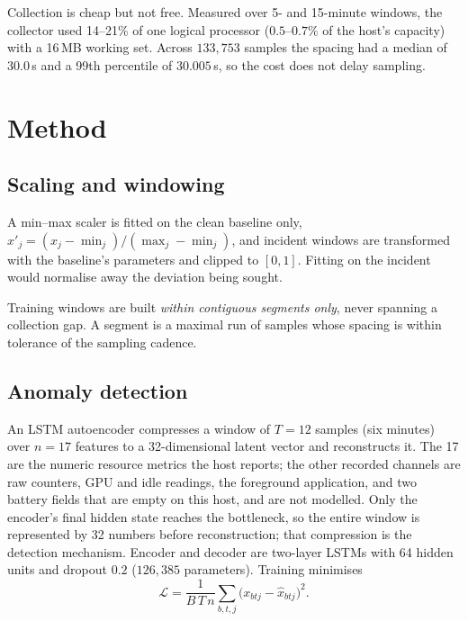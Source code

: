 \documentclass[conference,a4paper]{IEEEtran}
\begin{document}
Collection is cheap but not free. Measured over 5- and 15-minute windows,
the collector used 14--21\% of one logical processor ($0.5$--$0.7\%$ of the
host's capacity) with a 16\,MB working set. Across $133{,}753$ samples the
spacing had a median of $30.0$\,s and a 99th percentile of $30.005$\,s, so
the cost does not delay sampling.

\section{Method}
\label{sec:method}

\subsection{Scaling and windowing}

A min--max scaler is fitted on the clean baseline only,
$x'_j = (x_j - \min_j)/(\max_j - \min_j)$, and incident windows are transformed
with the baseline's parameters and clipped to $[0,1]$. Fitting on the incident
would normalise away the deviation being sought.

Training windows are built \emph{within contiguous segments only}, never
spanning a collection gap. A segment is a maximal run of samples whose spacing
is within tolerance of the sampling cadence.

\subsection{Anomaly detection}

An LSTM autoencoder compresses a window of $T=12$ samples (six minutes) over
$n=17$ features to a 32-dimensional latent vector and reconstructs it. The 17
are the numeric resource metrics the host reports; the other recorded
channels are raw counters, GPU and idle readings, the foreground application,
and two battery fields that are empty on this host, and are not modelled. Only the encoder's final
hidden state reaches the bottleneck, so the entire window is represented by 32
numbers before reconstruction; that compression is the detection mechanism.
Encoder and decoder are two-layer LSTMs with 64 hidden units and dropout
$0.2$ ($126{,}385$ parameters). Training minimises
\begin{equation}
\mathcal{L} = \frac{1}{B\,T\,n}\sum_{b,t,j}\bigl(x_{btj}-\hat{x}_{btj}\bigr)^2 .
\end{equation}
\end{document}
